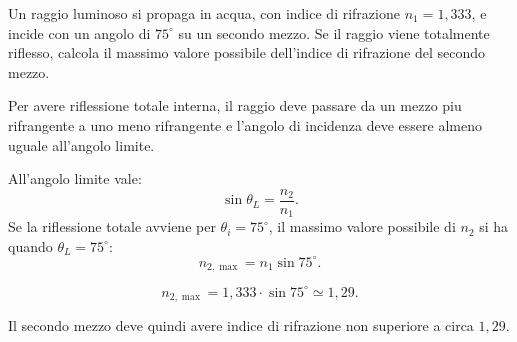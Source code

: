 
\begin{esercizio}
Un raggio luminoso si propaga in acqua, con indice di rifrazione
\(n_1=1{,}333\), e incide con un angolo di \(75^\circ\) su un secondo mezzo.
Se il raggio viene totalmente riflesso, calcola il massimo valore possibile
dell'indice di rifrazione del secondo mezzo.
\end{esercizio}

\begin{soluzione}
Per avere riflessione totale interna, il raggio deve passare da un mezzo piu
rifrangente a uno meno rifrangente e l'angolo di incidenza deve essere almeno
uguale all'angolo limite.

All'angolo limite vale:
\[
\sin\theta_L=\frac{n_2}{n_1}.
\]
Se la riflessione totale avviene per \(\theta_i=75^\circ\), il massimo valore
possibile di \(n_2\) si ha quando \(\theta_L=75^\circ\):
\[
n_{2,\max}=n_1\sin 75^\circ.
\]

\[
n_{2,\max}=1{,}333\cdot \sin 75^\circ
\simeq 1{,}29.
\]

Il secondo mezzo deve quindi avere indice di rifrazione non superiore a circa
\(1{,}29\).
\end{soluzione}
